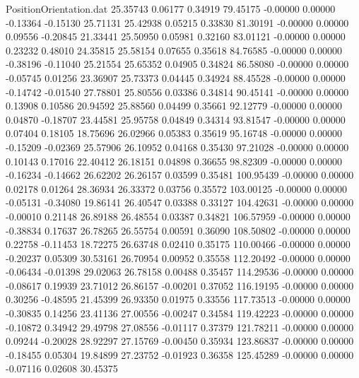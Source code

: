 \begin{filecontents}{PositionOrientation.dat}
  25.35743    0.06177    0.34919    79.45175   -0.00000    0.00000   -0.13364   -0.15130   25.71131
  25.42938    0.05215    0.33830    81.30191   -0.00000    0.00000    0.09556   -0.20845   21.33441
  25.50950    0.05981    0.32160    83.01121   -0.00000    0.00000    0.23232    0.48010   24.35815
  25.58154    0.07655    0.35618    84.76585   -0.00000    0.00000   -0.38196   -0.11040   25.21554
  25.65352    0.04905    0.34824    86.58080   -0.00000    0.00000   -0.05745    0.01256   23.36907
  25.73373    0.04445    0.34924    88.45528   -0.00000    0.00000   -0.14742   -0.01540   27.78801
  25.80556    0.03386    0.34814    90.45141   -0.00000    0.00000    0.13908    0.10586   20.94592
  25.88560    0.04499    0.35661    92.12779   -0.00000    0.00000    0.04870   -0.18707   23.44581
  25.95758    0.04849    0.34314    93.81547   -0.00000    0.00000    0.07404    0.18105   18.75696
  26.02966    0.05383    0.35619    95.16748   -0.00000    0.00000   -0.15209   -0.02369   25.57906
  26.10952    0.04168    0.35430    97.21028   -0.00000    0.00000    0.10143    0.17016   22.40412
  26.18151    0.04898    0.36655    98.82309   -0.00000    0.00000   -0.16234   -0.14662   26.62202
  26.26157    0.03599    0.35481   100.95439   -0.00000    0.00000    0.02178    0.01264   28.36934
  26.33372    0.03756    0.35572   103.00125   -0.00000    0.00000   -0.05131   -0.34080   19.86141
  26.40547    0.03388    0.33127   104.42631   -0.00000    0.00000   -0.00010    0.21148   26.89188
  26.48554    0.03387    0.34821   106.57959   -0.00000    0.00000   -0.38834    0.17637   26.78265
  26.55754    0.00591    0.36090   108.50802   -0.00000    0.00000    0.22758   -0.11453   18.72275
  26.63748    0.02410    0.35175   110.00466   -0.00000    0.00000   -0.20237    0.05309   30.53161
  26.70954    0.00952    0.35558   112.20492   -0.00000    0.00000   -0.06434   -0.01398   29.02063
  26.78158    0.00488    0.35457   114.29536   -0.00000    0.00000   -0.08617    0.19939   23.71012
  26.86157   -0.00201    0.37052   116.19195   -0.00000    0.00000    0.30256   -0.48595   21.45399
  26.93350    0.01975    0.33556   117.73513   -0.00000    0.00000   -0.30835    0.14256   23.41136
  27.00556   -0.00247    0.34584   119.42223   -0.00000    0.00000   -0.10872    0.34942   29.49798
  27.08556   -0.01117    0.37379   121.78211   -0.00000    0.00000    0.09244   -0.20028   28.92297
  27.15769   -0.00450    0.35934   123.86837   -0.00000    0.00000   -0.18455    0.05304   19.84899
  27.23752   -0.01923    0.36358   125.45289   -0.00000    0.00000   -0.07116    0.02608   30.45375

\end{filecontents}
